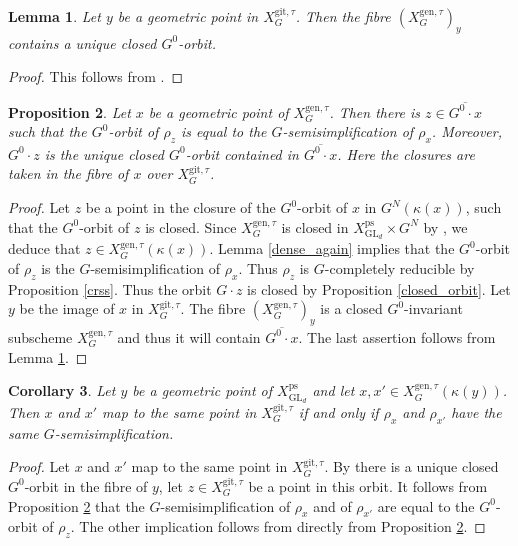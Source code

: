 \documentclass{amsart}
\newtheorem{prop}{Proposition}[section]
\newtheorem{lem}[prop]{Lemma}
\newtheorem{cor}[prop]{Corollary}
\theoremstyle{definition}
\theoremstyle{remark}
\DeclareMathOperator{\GL}{GL}
\newcommand{\ps}{\mathrm{ps}}
\newcommand{\gen}{\mathrm{gen}}
\newcommand{\gps}{\mathrm{git}}
\newcommand{\XpsGLd}{X^{\ps}_{\GL_d}}
\newcommand{\XgenGtau}{X^{\gen, \tau}_G}
\newcommand{\XgpsGtau}{X^{\gps, \tau}_{G}}
\newcommand{\git}{\mathrm{git}}
\begin{document}
\begin{lem}\label{closed_orbit_fibre} Let $y$ be a geometric point in $\XgpsGtau$. Then the fibre 
$(\XgenGtau)_y$ contains a unique closed $G^0$-orbit. 
\end{lem}
\begin{proof} This follows from \cite[Theorem 3]{seshadri}.
\end{proof}

\begin{prop}\label{orbit_ss} Let $x$ be a geometric point of $\XgenGtau$. Then there 
is $z\in \overline{G^0\cdot x}$ such that the $G^0$-orbit of $\rho_z$ is equal to 
the $G$-semisimplification of $\rho_x$. Moreover, $G^0\cdot z$ is the unique 
closed $G^0$-orbit contained in $\overline{G^0\cdot x}$. Here the closures are taken in the fibre of $x$ over $X^{\git, \tau}_G$.
 \end{prop}
 
\begin{proof}
    Let $z$ be a point in the closure of the $G^0$-orbit of $x$ in $G^N(\kappa(x))$, such that the $G^0$-orbit of $z$ is closed.
    Since $\XgenGtau$ is closed in $X^{\ps}_{\GL_d}\times G^N$ by , we deduce that $z\in \XgenGtau(\kappa(x))$. 
    Lemma \ref{dense_again} implies that the $G^0$-orbit of $\rho_{z}$ is the $G$-semisimplification of $\rho_x$.
    Thus $\rho_{z}$ is $G$-completely reducible  by Proposition \ref{crss}. 
    Thus the orbit $G\cdot z$ is closed by Proposition \ref{closed_orbit}.
    Let $y$ be the image of $x$ in $\XgpsGtau$. The fibre $(\XgenGtau)_y$ is a closed $G^0$-invariant subscheme $\XgenGtau$ and thus it will contain $\overline{G^0\cdot x}$. The last assertion follows from Lemma \ref{closed_orbit_fibre}.
\end{proof}
 


\begin{cor}\label{same_image} Let $y$ be a geometric point of $\XpsGLd$ and let 
$x, x'\in \XgenGtau(\kappa(y))$. Then $x$ and $x'$ map to the same point in 
$\XgpsGtau$ if and only if $\rho_x$ and $\rho_{x'}$ have the same $G$-semisimplification. 
\end{cor}

\begin{proof}
    Let $x$ and $x'$ map to the same point in $\XgpsGtau$.
    By  there is a unique closed $G^0$-orbit in the fibre of $y$, let $z \in \XgpsGtau$ be a point in this orbit.
    It follows from Proposition \ref{orbit_ss} that the $G$-semisimplification of $\rho_x$ and of $\rho_{x'}$ are equal to the $G^0$-orbit of $\rho_z$. The other implication follows from directly from Proposition \ref{orbit_ss}.
\end{proof}
\end{document}
